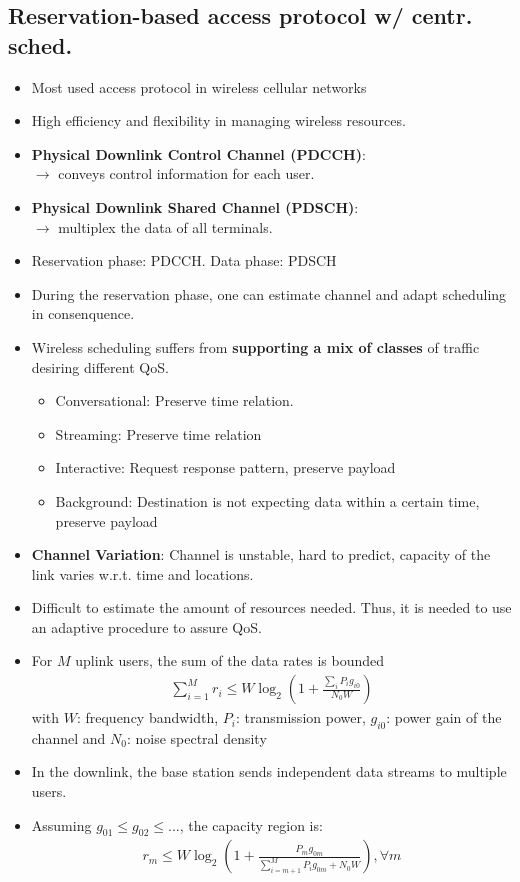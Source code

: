 \subsection{Reservation-based access protocol w/ centr. sched.}
\begin{itemize}
	\item Most used access protocol in wireless cellular networks
	\item High efficiency and flexibility in managing wireless resources.
	\item \textbf{Physical Downlink Control Channel (PDCCH)}: \\
	$\rightarrow$ conveys control information for each user.
	\item \textbf{Physical Downlink Shared Channel (PDSCH)}: \\
	$\rightarrow$ multiplex the data of all terminals.
	\item Reservation phase: PDCCH. Data phase: PDSCH
	\item During the reservation phase, one can estimate channel and adapt scheduling in consenquence.
	\item Wireless scheduling suffers from \textbf{supporting a mix of classes} of traffic desiring different QoS.
	\begin{itemize}
		\item Conversational: Preserve time relation.
    	\item Streaming: Preserve time relation
    	\item Interactive: Request response pattern, preserve payload
    	\item Background: Destination is not expecting data within a certain time, preserve payload
	\end{itemize}
	\item \textbf{Channel Variation}: Channel is unstable, hard to predict, capacity of the link varies w.r.t. time and locations.
	\item Difficult to estimate the amount of resources needed. Thus, it is needed to use an adaptive procedure to assure QoS.
	\item For $M$ uplink users, the sum of the data rates is bounded
	\begin{align*}
		\sum_{i=1}^M r_i \leq W \log_2 
			\left(
				1 + \frac{\sum_i P_i g_{i0}}{N_0 W}
			\right)
	\end{align*}
	with $W$: frequency bandwidth, $P_i$: transmission power, $g_{i0}$: power gain of the channel and $N_0$: noise spectral density
	\item In the downlink, the base station sends independent data streams to multiple users.
	\item Assuming $g_{01} \leq g_{02} \leq ...$, the capacity region is:
	\begin{align*}
		r_m \leq W \log_2 
			\left(
				1 + \frac{P_m g_{0m}}{\sum_{i=m+1}^M P_i g_{0m} + N_0 W}
			\right) , \forall m
	\end{align*}
\end{itemize}
